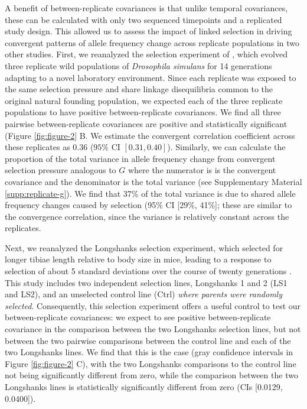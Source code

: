 \documentclass[11pt]{article}
\newcommand{\vb}[1]{{\it \color{blue} #1}}
\providecommand{\DIFaddbegin}{} %
\providecommand{\DIFaddend}{} %
\begin{document}
A benefit of between-replicate covariances is that unlike temporal covariances,
these can be calculated with only two sequenced timepoints and a replicated
study design. This allowed us to assess the impact of linked selection in
driving convergent patterns of allele frequency change across replicate
populations in two other studies. First, we reanalyzed the selection experiment
of \textcite{Kelly2019-dc}, which evolved three replicate wild populations of
\emph{Drosophila simulans} for 14 generations adapting to a novel laboratory
environment. Since each replicate was exposed to the same selection pressure
and share linkage disequilibria common to the original natural founding
population, we expected each of the three replicate populations to have
positive between-replicate covariances. We find all three pairwise
between-replicate covariances are positive and statistically significant
(Figure \ref{fig:figure-2} B. We estimate the convergent correlation
coefficient across these replicates as 0.36 ($95\%$ CI $[0.31, 0.40]$).
Similarly, we can calculate the proportion of the total variance in allele
frequency change from convergent selection pressure analogous to $G$ where the
numerator is is the convergent covariance and the denominator is the total
variance (see Supplementary Material \ref{supp:replicate-g}). We find that 37\%
of the total variance is due to shared allele frequency changes caused by
selection (95\% CI [29\%, 41\%]; these are similar to the convergence
correlation, since the variance is relatively constant across the replicates.


Next, we reanalyzed the Longshanks selection experiment, which selected for
longer tibiae length relative to body size in mice, leading to a response to
selection of about 5 standard deviations over the course of twenty generations
\parencite{Marchini2014-de,Castro2019-uk}. This study includes two independent
selection lines, Longshanks 1 and 2 (LS1 and LS2), and an unselected control
line (Ctrl) \DIFaddbegin \vb{where parents were randomly selected}\DIFaddend . Consequently, this
selection experiment offers a useful control to test our between-replicate
covariances: we expect to see positive between-replicate covariance in the
comparison between the two Longshanks selection lines, but not between the two
pairwise comparisons between the control line and each of the two Longshanks
lines. We find that this is the case (gray confidence intervals in Figure
\ref{fig:figure-2} C), with the two Longshanks comparisons to the control line
not being significantly different from zero, while the comparison between the
two Longshanks lines is statistically significantly different from zero (CIs
[0.0129, 0.0400]).
\end{document}
